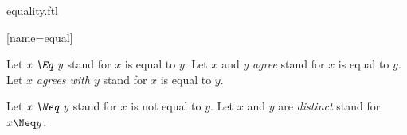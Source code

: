 \documentclass{stex}
\begin{document}
\begin{smodule}{equality.ftl}

[name=equal]{\mathrel{\comp=}}

\begin{forthel}
  \begin{convention}
    Let $\emph{x \Eq y}$ stand for $x$ is equal to $y$.
    Let $x$ and $y$ \emph{agree} stand for $x$ is equal to $y$.
    Let $x$ \emph{agrees with $y$} stand for $x$ is equal to $y$.
  \end{convention}
\end{forthel}

\begin{forthel}
  \begin{convention}
    Let $\emph{x \Neq y}$ stand for $x$ is not equal to $y$.
    Let $x$ and $y$ are \emph{distinct} stand for $x \Neq y$.
  \end{convention}
\end{forthel}

\end{smodule}
\end{document}
